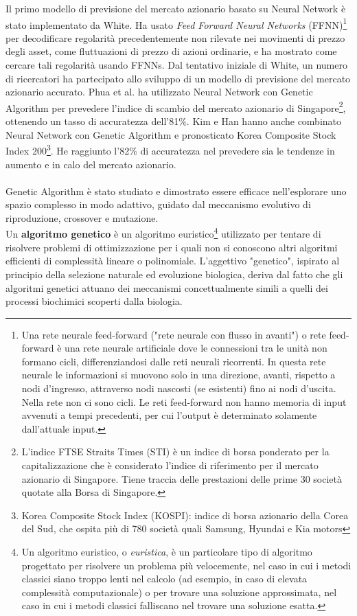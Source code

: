 \documentclass[a4paper,12pt]{report}
\begin{document}
Il primo modello di previsione del mercato azionario basato su Neural Network è stato implementato da White\cite{whitenn}. Ha usato \textit{Feed Forward Neural Networks} (FFNN)\footnote{Una rete neurale feed-forward ("rete neurale con flusso in avanti") o rete feed-forward è una rete neurale artificiale dove le connessioni tra le unità non formano cicli, differenziandosi dalle reti neurali ricorrenti. In questa rete neurale le informazioni si muovono solo in una direzione, avanti, rispetto a nodi d'ingresso, attraverso nodi nascosti (se esistenti) fino ai nodi d'uscita. Nella rete non ci sono cicli. Le reti feed-forward non hanno memoria di input avvenuti a tempi precedenti, per cui l'output è determinato solamente dall'attuale input. } per decodificare regolarità precedentemente non rilevate nei movimenti di prezzo degli asset, come fluttuazioni di prezzo di azioni ordinarie, e ha mostrato come cercare tali regolarità usando FFNNs. Dal tentativo iniziale di White, un numero di ricercatori ha partecipato allo sviluppo di un modello di previsione del mercato azionario accurato. Phua et al. \cite{puann} ha utilizzato Neural Network con Genetic Algorithm per prevedere l'indice di scambio del mercato azionario di Singapore\footnote{L'indice FTSE Straits Times (STI) è un indice di borsa ponderato per la capitalizzazione che è considerato l'indice di riferimento per il mercato azionario di Singapore. Tiene traccia delle prestazioni delle prime 30 società quotate alla Borsa di Singapore.}, ottenendo un tasso di accuratezza dell'81\%. Kim e Han \cite{kimnn} hanno anche combinato Neural Network con Genetic Algorithm e pronosticato Korea Composite Stock Index 200\footnote{Korea Composite Stock Index (KOSPI): indice di borsa azionario della Corea del Sud, che ospita più di 780 società quali Samsung, Hyundai e Kia motors}. He raggiunto l'82\% di accuratezza nel prevedere sia le tendenze in aumento e in calo del mercato azionario.\\~\\
Genetic Algorithm è stato studiato e dimostrato essere efficace nell'esplorare uno spazio complesso in modo adattivo, guidato dal meccanismo evolutivo di riproduzione, crossover e mutazione.\\
Un \textbf{algoritmo genetico} è un algoritmo euristico\footnote{Un algoritmo euristico, o \textit{euristica}, è un particolare tipo di algoritmo progettato per risolvere un problema più velocemente, nel caso in cui i metodi classici siano troppo lenti nel calcolo (ad esempio, in caso di elevata complessità computazionale) o per trovare una soluzione approssimata, nel caso in cui i metodi classici falliscano nel trovare una soluzione esatta.} utilizzato per tentare di risolvere problemi di ottimizzazione per i quali non si conoscono altri algoritmi efficienti di complessità lineare o polinomiale. L'aggettivo "genetico", ispirato al principio della selezione naturale ed evoluzione biologica, deriva dal fatto che gli algoritmi genetici attuano dei meccanismi concettualmente simili a quelli dei processi biochimici scoperti dalla biologia.\\
\end{document}
